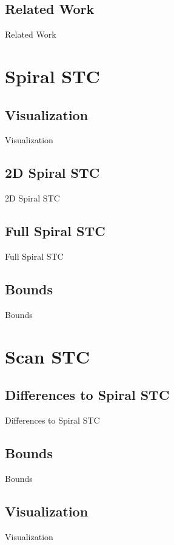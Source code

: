 \documentclass{beamer}
\begin{document}
\subsection{Related Work}
\begin{frame}{Related Work}
\end{frame}

\section{Spiral STC}
\subsection{Visualization}
\begin{frame}{Visualization}
\end{frame}
\subsection{2D Spiral STC}
\begin{frame}{2D Spiral STC}
\end{frame}
\subsection{Full Spiral STC}
\begin{frame}{Full Spiral STC}
\end{frame}
\subsection{Bounds}
\begin{frame}{Bounds}
\end{frame}

\section{Scan STC}
\subsection{Differences to Spiral STC}
\begin{frame}{Differences to Spiral STC}
\end{frame}
\subsection{Bounds}
\begin{frame}{Bounds}
\end{frame}
\subsection{Visualization}
\begin{frame}{Visualization}
\end{frame}
\end{document}
